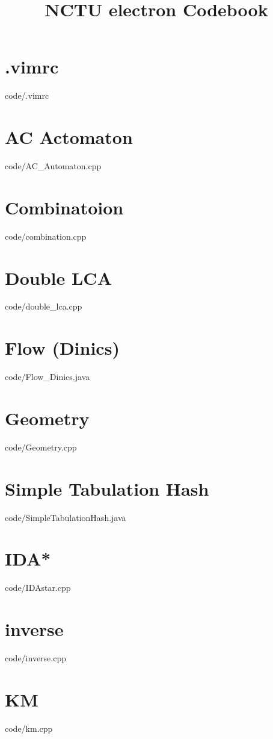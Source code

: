 \documentclass [landscape,10pt,a4paper,twocolumn]{article}
\title {NCTU electron Codebook}
\begin{document}
\maketitle
\tableofcontents
\section{.vimrc}
 {code/.vimrc}
\section{AC Actomaton}
 {code/AC_Automaton.cpp}
\section{Combinatoion}
 {code/combination.cpp}
\section{Double LCA}
 {code/double_lca.cpp}
\section{Flow (Dinics)}
 {code/Flow_Dinics.java}
\section{Geometry}
 {code/Geometry.cpp}
\section{Simple Tabulation Hash}
 {code/SimpleTabulationHash.java}
\section{IDA*}
 {code/IDAstar.cpp}
\section{inverse}
 {code/inverse.cpp}
\section{KM}
 {code/km.cpp}
\end{document}
